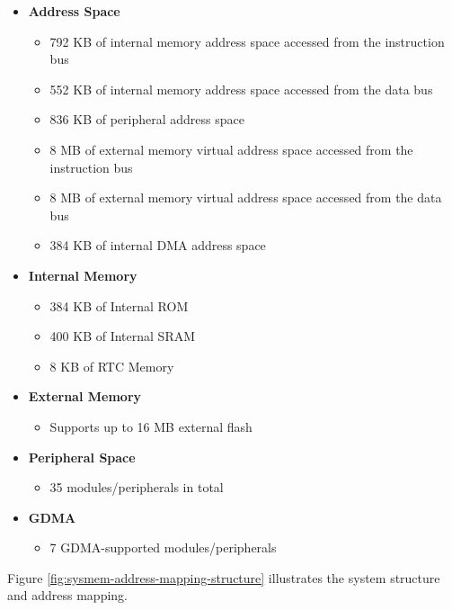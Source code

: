 \documentclass[main\_\_EN.tex]{subfiles}
\begin{document}
\begin{itemize}
    \item {\bfseries Address Space}
        \begin{itemize}
    	    \item 792 KB of internal memory address space accessed from the instruction bus 
    	    
    	    
    	    \item 552 KB of internal memory address space accessed from the data bus 
    	    
    	    
    	    \item 836 KB of peripheral address space
    	    \item 8 MB of external memory virtual address space accessed from the instruction bus
    	    \item 8 MB of external memory virtual address space accessed from the data bus
    	    \item 384 KB of internal DMA address space
        \end{itemize}
    \item {\bfseries Internal Memory}
        \begin{itemize}
            \item 384 KB of Internal ROM
	        \item 400 KB of Internal SRAM
	        \item 8 KB of RTC Memory
	    \end{itemize}
    \item {\bfseries External Memory}
        \begin{itemize}
            \item Supports up to 16 MB external flash
	    \end{itemize}
    \item {\bfseries Peripheral Space}
        \begin{itemize}
           \item 35 modules/peripherals in total
        \end{itemize}
    \item {\bfseries GDMA}
        \begin{itemize}
            \item 7 GDMA-supported modules/peripherals
        \end{itemize}
\end{itemize}

Figure \ref{fig:sysmem-address-mapping-structure} illustrates the system structure and address mapping.
\end{document}
